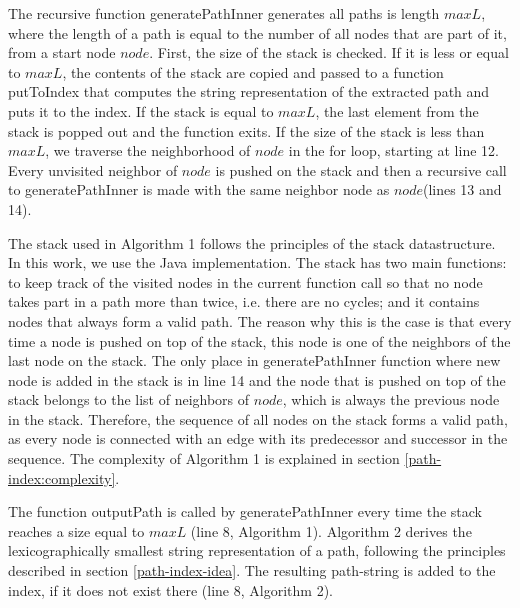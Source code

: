 \documentclass{l4proj}
\begin{document}
The recursive function \textrm{generatePathInner} generates all paths is length $maxL$, where the length of a path is equal to the number of all nodes that are part of it, from a start node $node$. First, the size of the stack is checked. If it is less or equal to $maxL$, the contents of the stack are copied and passed to a function \textrm{putToIndex} that computes the string representation of the extracted path and puts it to the index. If the stack is equal to $maxL$, the last element from the stack is popped out and the function exits. If the size of the stack is less than $maxL$, we traverse the neighborhood of $node$ in the for loop, starting at line 12. Every unvisited neighbor of $node$ is pushed on the stack and then a recursive call to \textrm{generatePathInner} is made with the same neighbor node as $node$(lines 13 and 14).\par
The stack used in \textrm{Algorithm 1} follows the principles of the stack datastructure. In this work, we use the Java implementation. The stack has two main functions: to keep track of the visited nodes in the current function call so that no node takes part in a path more than twice, i.e. there are no cycles; and it contains nodes that always form a valid path. The reason why this is the case is that every time a node is pushed on top of the stack, this node is one of the neighbors of the last node on the stack. The only place in generatePathInner function where new node is added in the stack is in line 14 and the node that is pushed on top of the stack belongs to the list of neighbors of $node$, which is always the previous node in the stack. Therefore, the sequence of all nodes on the stack forms a valid path, as every node is connected with an edge with its predecessor and successor in the sequence. The complexity of Algorithm 1 is explained in section \ref{path-index:complexity}.\par
The function \textrm{outputPath} is called by \textrm{generatePathInner} every time the stack reaches a size equal to $maxL$ (line 8, Algorithm 1). Algorithm 2 derives the lexicographically smallest string representation of a path, following the principles described in section \ref{path-index-idea}. The resulting path-string is added to the index, if it does not exist there (line 8, Algorithm 2). \par 
\end{document}
